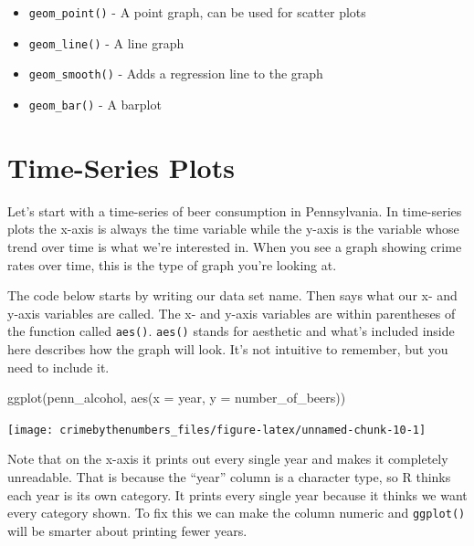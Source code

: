\documentclass[
  12pt,
  openany]{book}
\newenvironment{Shaded}{\begin{snugshade}}{\end{snugshade}}
\newcommand{\AttributeTok}[1]{\textcolor[rgb]{0.61,0.61,0.61}{#1}}
\newcommand{\FunctionTok}[1]{\textcolor[rgb]{0,0,0}{#1}}
\newcommand{\NormalTok}[1]{#1}
\providecommand{\tightlist}{%
  \setlength{\itemsep}{0pt}\setlength{\parskip}{0pt}}
\begin{document}
\begin{itemize}
\tightlist
\item
  \texttt{geom\_point()} - A point graph, can be used for scatter plots
\item
  \texttt{geom\_line()} - A line graph
\item
  \texttt{geom\_smooth()} - Adds a regression line to the graph
\item
  \texttt{geom\_bar()} - A barplot
\end{itemize}

\hypertarget{time-series-plots}{%
\section{Time-Series Plots}\label{time-series-plots}}

Let's start with a time-series of beer consumption in Pennsylvania. In time-series plots the x-axis is always the time variable while the y-axis is the variable whose trend over time is what we're interested in. When you see a graph showing crime rates over time, this is the type of graph you're looking at.

The code below starts by writing our data set name. Then says what our x- and y-axis variables are called. The x- and y-axis variables are within parentheses of the function called \texttt{aes()}. \texttt{aes()} stands for aesthetic and what's included inside here describes how the graph will look. It's not intuitive to remember, but you need to include it.

\begin{Shaded}
\begin{Highlighting}[]
\FunctionTok{ggplot}\NormalTok{(penn\_alcohol, }\FunctionTok{aes}\NormalTok{(}\AttributeTok{x =}\NormalTok{ year,}
                         \AttributeTok{y =}\NormalTok{ number\_of\_beers))}
\end{Highlighting}
\end{Shaded}

\begin{center}\texttt{[image: crimebythenumbers\_files/figure-latex/unnamed-chunk-10-1]} \end{center}

Note that on the x-axis it prints out every single year and makes it completely unreadable. That is because the ``year'' column is a character type, so R thinks each year is its own category. It prints every single year because it thinks we want every category shown. To fix this we can make the column numeric and \texttt{ggplot()} will be smarter about printing fewer years.
\end{document}
